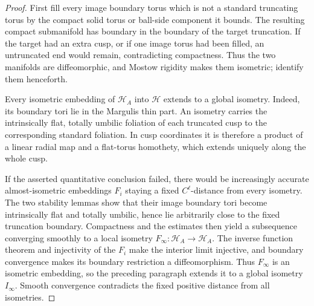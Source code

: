 \begin{proof}
\sketch
First fill every image boundary torus which is not a standard truncating torus
by the compact solid torus or ball-side component it bounds.  The resulting
compact submanifold has boundary in the boundary of the target truncation.  If
the target had an extra cusp, or if one image torus had been filled, an
untruncated end would remain, contradicting compactness.  Thus the two
manifolds are diffeomorphic, and Mostow rigidity makes them isometric; identify
them henceforth.

Every isometric embedding of \(\mathcal H_A\) into \(\mathcal H\) extends to a
global isometry.  Indeed, its boundary tori lie in the Margulis thin part.
An isometry carries the intrinsically flat, totally umbilic foliation of each
truncated cusp to the corresponding standard foliation.  In cusp coordinates
it is therefore a product of a linear radial map and a flat-torus homothety,
which extends uniquely along the whole cusp.

If the asserted quantitative conclusion failed, there would be increasingly
accurate almost-isometric embeddings \(F_i\) staying a fixed \(C^\ell\)-distance
from every isometry.  The two stability lemmas show that their image boundary
tori become intrinsically flat and totally umbilic, hence lie arbitrarily close
to the fixed truncation boundary.  Compactness and the estimates then yield a
subsequence converging smoothly to a local isometry
\(F_\infty:\mathcal H_A\to\mathcal H_A\).  The inverse function theorem and
injectivity of the \(F_i\) make the interior limit injective, and boundary
convergence makes its boundary restriction a diffeomorphism.  Thus
\(F_\infty\) is an isometric embedding, so the preceding paragraph extends it
to a global isometry \(I_\infty\).  Smooth convergence contradicts the fixed
positive distance from all isometries.
\end{proof}
